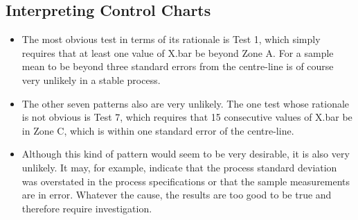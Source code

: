\documentclass[]{report}
\begin{document}
\subsection{Interpreting Control Charts}
\begin{itemize}
\item The most obvious test in terms of its rationale is Test 1, which simply requires that at
least one value of X.bar be beyond Zone A. For a sample mean to be beyond three
standard errors from the centre-line is of course very unlikely in a stable process.
\item The other seven patterns also are very unlikely.
The one test whose rationale is not obvious is Test 7, which requires that 15
consecutive values of X.bar be in Zone C, which is within one standard error of the
centre-line.
\item Although this kind of pattern would seem to be very desirable, it is also very unlikely.
It may, for example, indicate that the process standard deviation was overstated in
the process specifications or that the sample measurements are in error. Whatever
the cause, the results are too good to be true and therefore require investigation.
\end{itemize}
\end{document}
